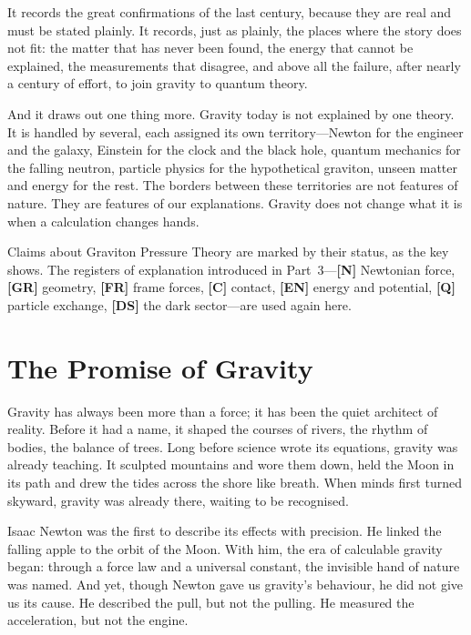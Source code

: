 \documentclass[11pt,a4paper]{article}
\newcommand{\reg}[1]{\textsf{\small\textbf{[#1]}}}
\newcommand{\RN}{\reg{N}}
\newcommand{\RGR}{\reg{GR}}
\newcommand{\RFR}{\reg{FR}}
\newcommand{\RC}{\reg{C}}
\newcommand{\REN}{\reg{EN}}
\newcommand{\RQ}{\reg{Q}}
\newcommand{\RDS}{\reg{DS}}
\begin{document}
It records the great confirmations of the last century, because they are real and must be stated plainly. It records, just as plainly, the places where the story does not fit: the matter that has never been found, the energy that cannot be explained, the measurements that disagree, and above all the failure, after nearly a century of effort, to join gravity to quantum theory.

And it draws out one thing more. Gravity today is not explained by one theory. It is handled by several, each assigned its own territory---Newton for the engineer and the galaxy, Einstein for the clock and the black hole, quantum mechanics for the falling neutron, particle physics for the hypothetical graviton, unseen matter and energy for the rest. The borders between these territories are not features of nature. They are features of our explanations. Gravity does not change what it is when a calculation changes hands.

Claims about Graviton Pressure Theory are marked by their status, as the key shows. The registers of explanation introduced in Part~3---\RN{} Newtonian force, \RGR{} geometry, \RFR{} frame forces, \RC{} contact, \REN{} energy and potential, \RQ{} particle exchange, \RDS{} the dark sector---are used again here.

\statuskey

\section{The Promise of Gravity}

Gravity has always been more than a force; it has been the quiet architect of reality. Before it had a name, it shaped the courses of rivers, the rhythm of bodies, the balance of trees. Long before science wrote its equations, gravity was already teaching. It sculpted mountains and wore them down, held the Moon in its path and drew the tides across the shore like breath. When minds first turned skyward, gravity was already there, waiting to be recognised.

Isaac Newton was the first to describe its effects with precision. He linked the falling apple to the orbit of the Moon. With him, the era of calculable gravity began: through a force law and a universal constant, the invisible hand of nature was named. And yet, though Newton gave us gravity's behaviour, he did not give us its cause. He described the pull, but not the pulling. He measured the acceleration, but not the engine.
\end{document}
